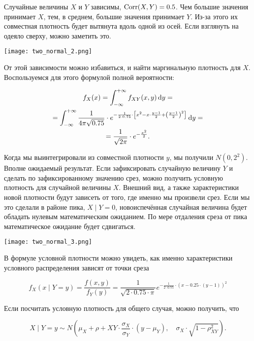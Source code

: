 Случайные величины $X$ и $Y$ зависимы, $\operatorname{Corr}(X,Y) = 0.5$. Чем большие значения принимает $X$, тем, в среднем, большие значения принимает $Y$.   Из-за этого их совместная плотность будет вытянута вдоль одной из осей. Если взглянуть на одеяло сверху, можно заметить это. 


\begin{center}
\texttt{[image: two\_normal\_2.png]}
\end{center}

От этой зависимости можно избавиться, и найти маргинальную плотность для $X$. Воспользуемся для этого формулой полной вероятности: 

\begin{multline*}
f_X(x) = \int_{-\infty}^{+\infty} f_{XY}(x,y) \,\mathrm{d}y = \\ = \int_{-\infty}^{+\infty} \frac{1}{4 \pi \sqrt{0.75}} \cdot e^{-\frac{1}{2 \cdot 0.75} \cdot \left[ x^2 - x \cdot \frac{y - 1}{2} + \left( \frac{y - 1}{2}    \right)^2   \right]} \,\mathrm{d}y  = \\ = \frac{1}{\sqrt{2 \pi} }\cdot e^{-\frac{x^2}{2}}.
\end{multline*}

Когда мы выинтегрировали из совместной плотности $y$, мы получили $N(0,2^2)$. Вполне ожидаемый результат.  Если зафиксировать случайную величину $Y$ и сделать по зафиксированному значению срез, можно получить условную плотность для случайной величины $X$.  Внешний вид, а также характеристики новой плотности  будут зависеть от того, где именно мы произвели срез. Если мы это сделали в районе пика, $X \mid Y=0$,  новоиспечённая случайная величина будет обладать нулевым математическим ожиданием. По мере отдаления среза от пика математическое ожидание будет сдвигаться. 

\begin{center}
	\texttt{[image: two\_normal\_3.png]}
\end{center}

В формуле условной плотности можно увидеть, как именно характеристики условного распределения зависят от точки среза

\[
f_X(x \mid Y = y)  = \frac{f(x,y)}{f_Y(y)} = \frac{1}{\sqrt{2 \cdot 0.75 \cdot \pi}} e^{-\frac{1}{2 \cdot 0.75} \cdot(x - 0.25 \cdot(y-1))^2}
\]

Если посчитать условную плотность для общего случая, можно получить, что 

\[ X \mid Y=y \sim N \left(\mu_X + \rho+{XY} \cdot \frac{\sigma_X}{\sigma_Y} \cdot(y - \mu_Y), \quad \sigma_X \cdot \sqrt{1- \rho_{XY}^2} \right).\]

